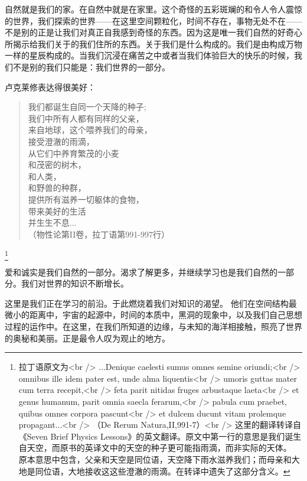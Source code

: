     自然就是我们的家。在自然中就是在家里。这个奇怪的五彩斑斓的和令人令人震惊的世界，我们探索的世界——在这里空间颗粒化，时间不存在，事物无处不在——不是别的正是让我们对真正自我感到奇怪的东西。因为这是唯一我们自然的好奇心所揭示给我们关于的我们住所的东西。关于我们是什么构成的。我们是由构成万物一样的星辰构成的。当我们沉浸在痛苦之中或者当我们体验巨大的快乐的时候，我们不是别的我们只能是：我们世界的一部分。
 
   卢克莱修表达得很美好：
\begin{verse} 

我们都诞生自同一个天降的种子;\\
我们中所有人都有同样的父亲，\\
来自地球，这个喂养我们的母亲，\\
接受澄澈的雨滴，\\
从它们中养育繁茂的小麦\\
和茂密的树木，\\
和人类，\\
和野兽的种群，\\
提供所有滋养一切躯体的食物，\\
带来美好的生活\\
并生生不息...\\
（物性论第II卷，拉丁语第991-997行）
 
\end{verse} 
\footnote[3]
{
拉丁语原文为<br />
...Denique caelesti sumus omnes semine oriundi;<br />
omnibus ille idem pater est, unde alma liquentis<br />
umoris guttas mater cum terra recepit,<br />
feta parit nitidas fruges arbustaque laeta<br />
et genus humanum, parit omnia saecla ferarum,<br />
pabula cum praebet, quibus omnes corpora pascunt<br />
et dulcem ducunt vitam prolemque propagant...<br />
（De Rerum Natura,II,991-7）<br />
这里的翻译转译自《Seven Brief Physics Lessons》的英文翻译。原文中第一行的意思是我们诞生自天空，而原书的英译文中的天空的种子更可能指雨滴，而非实际的天体。
原本意思中包含，父亲和天空是同位语，天空降下雨水滋养我们；而母亲和大地是同位语，大地接收这这些澄澈的雨滴。在转译中遗失了这部分含义。
}

    爱和诚实是我们自然的一部分。渴求了解更多，并继续学习也是我们自然的一部分。我们对世界的知识不断增长。
 
   这里是我们正在学习的前沿。于此燃烧着我们对知识的渴望。 他们在空间结构最微小的距离中，宇宙的起源中，时间的本质中，黑洞的现象中，以及我们自己思想过程的运作中。在这里，在我们所知道的边缘，与未知的海洋相接触，照亮了世界的奥秘和美丽。正是最令人叹为观止的地方。




\noindent
